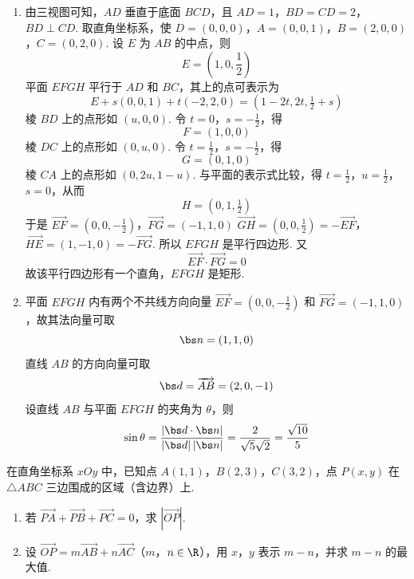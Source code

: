 \begin{solution}
\begin{enumerate}
\item 由三视图可知，\(AD\) 垂直于底面 \(BCD\)，且
\(AD=1\)，\(BD=CD=2\)，\(BD\perp CD\).
取直角坐标系，使
\(D=(0,0,0)\)，\(A=(0,0,1)\)，\(B=(2,0,0)\)，\(C=(0,2,0)\).
设 \(E\) 为 \(AB\) 的中点，则
\[
E=\left(1,0,\frac12\right)
\]
平面 \(EFGH\) 平行于 \(AD\) 和 \(BC\)，其上的点可表示为
\[
E+s(0,0,1)+t(-2,2,0)=(1-2t,2t,\tfrac12+s)
\]
棱 \(BD\) 上的点形如 \((u,0,0)\). 令 \(t=0\)，\(s=-\tfrac12\)，得
\[
F=(1,0,0)
\]
棱 \(DC\) 上的点形如 \((0,u,0)\). 令 \(t=\tfrac12\)，\(s=-\tfrac12\)，得
\[
G=(0,1,0)
\]
棱 \(CA\) 上的点形如 \((0,2u,1-u)\). 与平面的表示式比较，得 \(t=\tfrac12\)，\(u=\tfrac12\)，\(s=0\)，从而
\[
H=(0,1,\tfrac12)
\]
于是
\(\overrightarrow{EF}=\left(0,0,-\frac12\right)\)，\(\overrightarrow{FG}=(-1,1,0)\)
\(\overrightarrow{GH}=\left(0,0,\frac12\right)=-\overrightarrow{EF}\)，\(\overrightarrow{HE}=(1,-1,0)=-\overrightarrow{FG}\).
所以 \(EFGH\) 是平行四边形. 又
\[
\overrightarrow{EF}\cdot\overrightarrow{FG}=0
\]
故该平行四边形有一个直角，\(EFGH\) 是矩形.

\item 平面 \(EFGH\) 内有两个不共线方向向量 \(\overrightarrow{EF}=(0,0,-\frac{1}{2})\) 和 \(\overrightarrow{FG}=(-1,1,0)\)，故其法向量可取
\[
\bs n=(1,1,0)
\]
直线 \(AB\) 的方向向量可取
\[
\bs d=\overrightarrow{AB}=(2,0,-1)
\]
设直线 \(AB\) 与平面 \(EFGH\) 的夹角为 \(\theta\)，则
\[
\sin\theta=\frac{|\bs d\cdot\bs n|}{|\bs d|\,|\bs n|}
=\frac{2}{\sqrt5\sqrt2}=\frac{\sqrt{10}}5
\]
\end{enumerate}
\end{solution}

\begin{problem}
在直角坐标系 \(xOy\) 中，已知点 \(A(1,1)\)，\(B(2,3)\)，\(C(3,2)\)，点 \(P(x,y)\) 在 \(\triangle ABC\) 三边围成的区域（含边界）上.
\begin{enumerate}
\item 若 \(\overrightarrow{PA} + \overrightarrow{PB} + \overrightarrow{PC} = 0\)，求 \(\left|\overrightarrow{OP}\right|\).
\item 设 \(\overrightarrow{OP} = m\overrightarrow{AB} + n\overrightarrow{AC}\)（\(m\)，\(n \in \R\)），用 \(x\)，\(y\) 表示 \(m - n\)，并求 \(m - n\) 的最大值.
\end{enumerate}
\end{problem}

